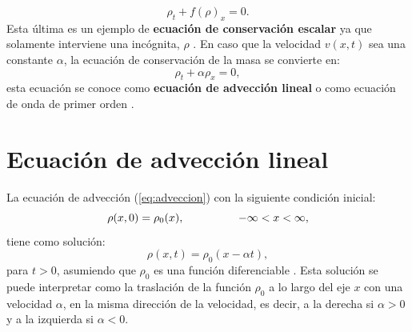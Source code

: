 \begin{equation}
	\rho_t + f(\rho)_x = 0.
\end{equation}
Esta última es un ejemplo de \textbf{ecuación de conservación escalar} \cite{Leveque} ya que solamente interviene una incógnita, $\rho$ \cite{Leveque}.
En caso que la velocidad $v(x,t)$ sea una constante $\alpha$, la ecuación de conservación de la masa se convierte en:
\begin{equation}
	\rho_t + \alpha\rho_x = 0,
	\label{eq:adveccion}
\end{equation}
esta ecuación se conoce como \textbf{ecuación de advección lineal} o como ecuación de onda de primer orden \cite{Leveque}\cite{heattransfer}.
\section{Ecuación de advección lineal}
La ecuación de advección (\ref{eq:adveccion}) con la siguiente condición inicial:
\begin{equation}
	\rho(x,0) = \rho_0(x), \hspace{1.7cm} -\infty < x < \infty,
\end{equation}
tiene como solución:
\begin{equation}
	\rho(x,t) = \rho_0(x - \alpha t),
	\label{eq:sol-advec}
\end{equation}
para $t> 0$, asumiendo que $\rho_0$ es una función diferenciable \cite{Leveque}. Esta solución se puede interpretar como la traslación de la función $\rho_0$ a lo largo del eje $x$ con una velocidad $\alpha$, en la misma dirección de la velocidad, es decir, a la derecha si $\alpha > 0$ y a la izquierda si $\alpha < 0$.

